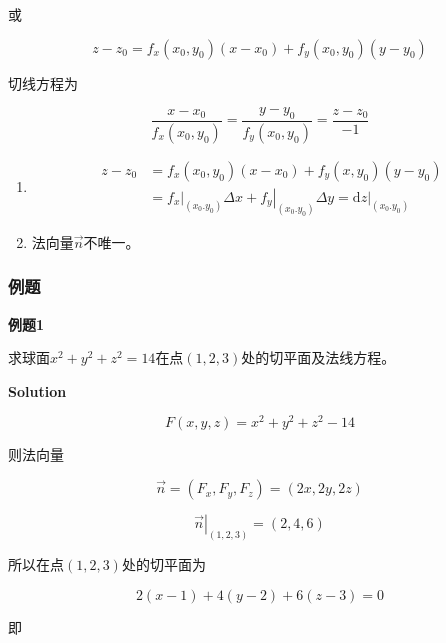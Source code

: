 \documentclass[12pt, a4paper]{article}
\numberwithin{equation}{section}
\newcommand{\rmd}{\mathrm{d}}
\begin{document}
    或

    \begin{equation}
        z-z_0=f_x\left(x_0, y_0\right)\left(x-x_0\right)+f_y\left(x_0, y_0\right)\left(y-y_0\right)
    \end{equation}

    切线方程为

    \begin{equation}
        \frac{x-x_0}{f_x\left(x_0, y_0\right)}=\frac{y-y_0}{f_y\left(x_0, y_0\right)}=\frac{z-z_0}{-1}
    \end{equation}

    \begin{enumerate}
        \item $$
                \begin{aligned}
                    z-z_0 & =f_x\left(x_0, y_0\right)\left(x-x_0\right)+f_y\left(x, y_0\right)\left(y-y_0\right) \\
                    & =\left.f_x\right|_{\left(x_0.y_0\right)}\Delta x+\left.f_y\right|_{\left(x_0.y_0\right)} \Delta y=\rmd \left.z\right|_{\left(x_0.y_0\right)}
                \end{aligned}
            $$
        \item 法向量\(\overrightarrow{n}\)不唯一。
    \end{enumerate}

\subsubsection{例题}

    \textbf{例题1}

    求球面\(x^2+y^2+z^2=14\)在点\(\left(1,2,3\right)\)处的切平面及法线方程。
    \vspace{1em}

    \textbf{Solution}
    \vspace{1em}

    $$
        F(x, y, z)=x^2+y^2+z^2-14
    $$

    则法向量

    $$
        \overrightarrow{n}=\left(F_x, F_y, F_z\right)=(2 x, 2 y, 2 z)
    $$

    $$
        \left.\overrightarrow{n}\right|_{(1,2,3)}=(2,4,6)
    $$
    
    所以在点\(\left(1,2,3\right)\)处的切平面为

    $$
        2(x-1)+4(y-2)+6(z-3)=0
    $$

    即
\end{document}
